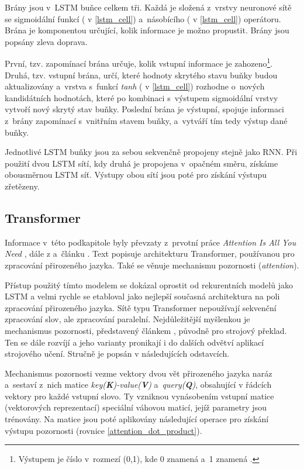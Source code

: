 Brány jsou v~LSTM buňce celkem tři. Každá je složená z~vrstvy neuronové sítě se sigmoidální funkcí ( v \ref{lstm_cell}) a~násobícího (\uv{$\times$} v \ref{lstm_cell}) operátoru. Brána je komponentou určující, kolik informace je možno propustit. Brány jsou popsány zleva doprava.\par
První, tzv. zapomínací brána určuje, kolik vstupní informace je zahozeno\footnote{Výstupem je číslo v~rozmezí (0,1), kde 0 znamená  a~1 znamená .}. Druhá, tzv. vstupní brána, určí, které hodnoty skrytého stavu buňky budou aktualizovány a~vrstva s~funkcí \emph{tanh} ( v \ref{lstm_cell}) rozhodne o~nových kandidátních hodnotách, které po kombinaci s~výstupem sigmoidální vrstvy vytvoří nový skrytý stav buňky. Poslední brána je výstupní, spojuje informaci z~brány zapomínací s~vnitřním stavem buňky, a~vytváří tím tedy výstup dané buňky.\par
Jednotlivé LSTM buňky jsou za sebou sekvenčně propojeny stejně jako RNN. Při použití dvou LSTM sítí, kdy druhá je propojena v~opačném směru, získáme obousměrnou LSTM síť. Výstupy obou sítí jsou poté pro získání výstupu zřetězeny.

\subsection{Transformer}
\label{transformers}
Informace v~této podkapitole byly převzaty z~prvotní práce \emph{Attention Is All You Need} \cite{Transformers}, dále z \cite{attention_mechanism} a~článku \cite{Transformers-explained}. Text popisuje  architekturu Transformer, používanou pro zpracování přirozeného jazyka. Také se věnuje mechanismu pozornosti (\emph{attention}).\par
Přístup použitý tímto modelem se dokázal oprostit od rekurentních modelů jako LSTM a velmi rychle se etabloval jako  nejlepší současná architektura na poli zpracování přirozeného jazyka. Sítě typu Transformer nepoužívají sekvenční zpracování slov, ale zpracování paralelní. Nejdůležitější myšlenkou je  mechanismus pozornosti, představený článkem \cite{attention_mechanism}, původně pro strojový překlad. Ten se dále rozvíjí a jeho varianty pronikají i do dalších odvětví aplikací strojového učení. Stručně je popsán v následujících odstavcích.\par \medskip

Mechanismus pozornosti vezme vektory dvou vět přirozeného jazyka naráz a~sestaví z~nich matice \emph{key(\textbf{K})-value(\textbf{V})} a~\emph{query(\textbf{Q})}, obsahující v řádcích vektory pro každé vstupní slovo. Ty vzniknou vynásobením vstupní matice (vektorových reprezentací) speciální váhovou maticí, jejíž parametry jsou trénovány. Na matice jsou poté aplikovány následující operace pro získání výstupu pozornosti (rovnice \ref{attention_dot_product}).

